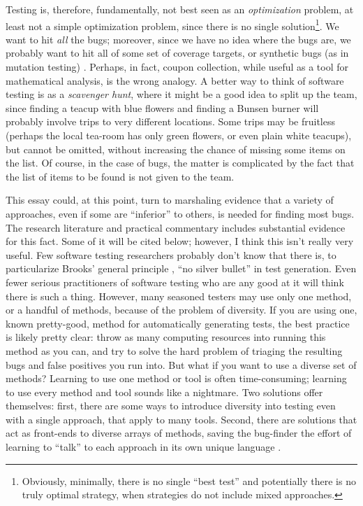 \documentclass[sigplan,screen]{acmart}
\begin{document}
Testing is, therefore,
fundamentally, not best seen as an \emph{optimization} problem, at
least not a simple optimization problem, since
there is no single solution\footnote{Obviously, minimally, there is no single ``best
test'' and potentially there is no truly optimal strategy, when strategies do not
include mixed approaches.}.  We want to hit \emph{all} the bugs; moreover, since we have
no idea where the bugs are, we probably want to hit all of some set of
coverage targets, or synthetic bugs (as in mutation testing)
\cite{Discontents}.  Perhaps, in fact, coupon collection, while useful
as a tool for mathematical analysis, is the wrong analogy.  A better
way to think of software testing is as a \emph{scavenger hunt}, where
it might be a good idea to split up the team, since finding a teacup
with blue flowers and finding a Bunsen burner will probably involve
trips to very different locations.  Some trips may be fruitless
(perhaps the local tea-room has only green flowers, or even plain white
teacups), but cannot be omitted, without increasing the chance of
missing some items on the list.  Of course, in the case of bugs, the
matter is complicated by the fact that the list of items to be found
is not given to the team.

This essay could, at this point, turn to marshaling evidence that a
variety of approaches, even if some are ``inferior'' to others, is
needed for finding most bugs.  The research literature and practical
commentary includes substantial evidence for this fact.  Some of it
will be cited below; however, I think this isn't really very useful.
Few software testing researchers probably don't know that there is, to
particularize Brooks' general principle \cite{Brooks1987NoSB}, ``no silver bullet'' in test
generation.  Even fewer serious practitioners of software testing who
are any good at it will think there is such a thing.  However, many
seasoned testers may use only one method, or a handful of methods,
because of the problem of diversity.  If you are using one, known
pretty-good, method for automatically generating tests, the best
practice is likely pretty clear:  throw as many computing resources
into running this method as you can, and try to solve the hard problem
of triaging the resulting bugs and false positives you run into.  But
what if you want to use a diverse set of methods?  Learning to use one
method or tool is often time-consuming; learning to use every method
and tool sounds like a nightmare.  Two solutions offer themselves:
first, there are some ways to introduce diversity into testing even
with a single approach, that apply to many tools.  Second, there are
solutions that act as front-ends to diverse arrays of methods, saving
the bug-finder the effort of learning to ``talk'' to each approach in
its own unique language \cite{WODACommon}.
\end{document}
